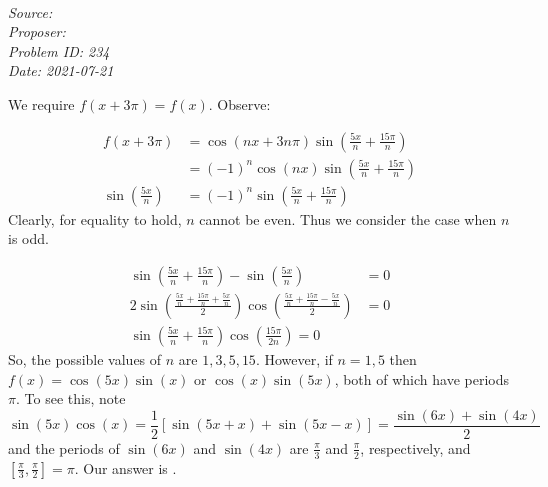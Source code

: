 \SSbreak\\
\emph{Source: \Cfolk}\\
\emph{Proposer: \Pss}\\
\emph{Problem ID: 234}\\
\emph{Date: 2021-07-21}\\
\Easy
\SSbreak

\bigskip

\begin{solution}\hfil\medskip

We require \(f(x+3\pi)=f(x)\). Observe:

\begin{align*}
  f(x+3\pi)&=\cos(nx+3n\pi)\sin\left(\frac{5x}{n}+\frac{15\pi}{n}\right)\\
  &=(-1)^n\cos(nx)\sin\left(\frac{5x}{n}+\frac{15\pi}{n}\right)\\
  \sin\left(\frac{5x}{n}\right)&=(-1)^n\sin\left(\frac{5x}{n}+\frac{15\pi}{n}\right)
\end{align*}
Clearly, for equality to hold, \(n\) cannot be even. Thus we consider the case when \(n\) is odd.

\begin{align*}
  \sin\left(\frac{5x}{n}+\frac{15\pi}{n}\right)-\sin\left(\frac{5x}{n}\right)&=0\\
  2\sin\left(\frac{\frac{5x}{n}+\frac{15\pi}{n}+\frac{5x}{n}}{2}\right)\cos\left(\frac{\frac{5x}{n}+\frac{15\pi}{n}-\frac{5x}{n}}{2}\right)&=0\\
  \sin\left(\frac{5x}{n}+\frac{15\pi}{n}\right)\cos\left(\frac{15\pi}{2n}\right)=0
\end{align*}
So, the possible values of $n$ are $1, 3, 5, 15$. However, if $n = 1, 5$ then 
$f(x) = \cos(5x)\sin(x)$ or $\cos(x)\sin(5x)$, both of which have periods $\pi$. 
To see this, note $$\sin(5x)\cos(x) = \dfrac{1}{2}\left[\sin(5x + x) + \sin(5x - x)\right] = \dfrac{\sin(6x) + \sin(4x)}{2}$$
and the periods of $\sin(6x)$ and $\sin(4x)$ are $\frac{\pi}{3}$ and $\frac{\pi}{2}$, respectively, 
and $\left[\frac{\pi}{3}, \frac{\pi}{2}\right] = \pi$. Our answer is .
\end{solution}